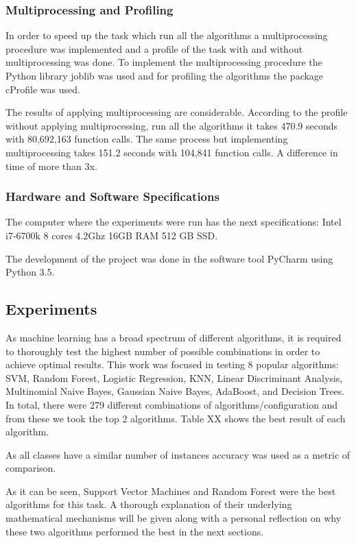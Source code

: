 \documentclass[letterpaper,10pt]{article}
\theoremstyle{mytheor}
\begin{document}
\subsubsection{Multiprocessing and Profiling}
In order to speed up the task which run all the algorithms a multiprocessing procedure was implemented and a profile of the task with and without multiprocessing was done. To implement the multiprocessing procedure the Python library joblib was used and for profiling the algorithms the package cProfile was used.

The results of applying multiprocessing are considerable. According to the profile without applying multiprocessing, run all the algorithms it takes 470.9 seconds with 80,692,163 function calls. The same process but implementing multiprocessing takes 151.2 seconds with 104,841 function calls. A difference in time of more than 3x.

\subsubsection{Hardware and Software Specifications}

The computer where the experiments were run has the next specifications: Intel i7-6700k 8 cores 4.2Ghz 16GB RAM 512 GB SSD.

The development of the project was done in the software tool PyCharm using Python 3.5.

\subsection{Experiments}
As machine learning has a broad spectrum of different algorithms, it is required to thoroughly test  the highest number of possible combinations in order to achieve optimal results. This work was focused in testing 8 popular algorithms: SVM, Random Forest, Logistic Regression, KNN, Linear Discriminant Analysis, Multinomial Naive Bayes, Gaussian Naive Bayes, AdaBoost, and Decision Trees. In total, there were 279 different combinations of algorithms/configuration and from these we took the top 2 algorithms. Table XX shows the best result of each algorithm.

As all classes have a similar number of instances accuracy was used as a metric of comparison. 


As it can be seen, Support Vector Machines and Random Forest were the best algorithms for this task. A thorough explanation of their underlying mathematical mechanisms will be given along with a personal reflection on why these two algorithms performed the best in the next sections.
\end{document}
